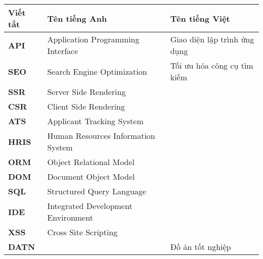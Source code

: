 \documentclass[../DoAn.tex]{subfiles}
\begin{document}
\begin{longtable}{l p{6cm} p{7cm}}
	\hline
   \textbf{Viết tắt}  & \textbf{Tên tiếng Anh}	& \textbf{Tên tiếng Việt} \\ \hline 
	\textbf{API} & Application Programming Interface & Giao diện lập trình ứng dụng\\
    \textbf{SEO} & Search Engine Optimization & Tối ưu hóa công cụ tìm kiếm  \\
    \textbf{SSR} & Server Side Rendering &\\
    \textbf{CSR} & Client Side Rendering&\\
    \textbf{ATS} & Applicant Tracking System & \\
    \textbf{HRIS} & Human Resources Information System & \\
    \textbf{ORM} & Object Relational Model & \\
    \textbf{DOM} & Document Object Model & \\
    \textbf{SQL} & Structured Query Language & \\
    \textbf{IDE} & Integrated Development Environment & \\
    \textbf{XSS} & Cross Site Scripting & \\
	\textbf{DATN} &  & Đồ án tốt nghiệp & \\
    \hline
\end{longtable}
\end{document}
